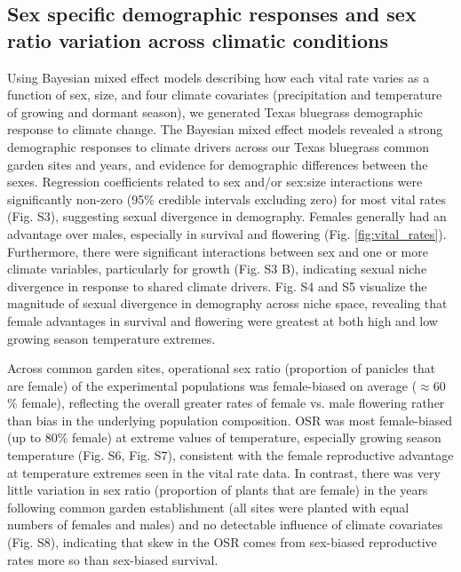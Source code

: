 \documentclass[9pt,twocolumn,twoside,lineno]{pnas-new}
\newcommand{\tom}[2]{{\color{red}{#1}}\footnote{\textit{\color{red}{#2}}}}
\begin{document}
\subsection*{Sex specific demographic responses and sex ratio variation across climatic conditions}
Using Bayesian mixed effect models describing how each vital rate  varies as a function of sex, size, and four climate covariates  (precipitation and temperature of growing and dormant season), we generated Texas bluegrass demographic response to climate change. 
The Bayesian mixed effect models revealed a strong demographic responses to climate drivers across our Texas bluegrass common garden sites and years, and evidence for demographic differences between the sexes. 
Regression coefficients related to sex and/or sex:size interactions were significantly non-zero (95\% credible intervals excluding zero) for most vital rates (Fig. S3), suggesting sexual divergence in demography. 
Females generally had an advantage over males, especially in survival and flowering (Fig. \ref{fig:vital_rates}). 
Furthermore, there were significant interactions between sex and one or more climate variables, particularly for growth (Fig. S3 B), indicating sexual niche divergence in response to shared climate drivers.  
Fig. S4 and  S5 visualize the magnitude of sexual divergence in demography across niche space, revealing that female advantages in survival and flowering  were greatest at both high and low growing season temperature extremes. 

Across common garden sites, operational sex ratio (proportion of panicles that are female) of the experimental populations was female-biased on average ($\approx 60$ \% female), reflecting the overall greater rates of female vs. male flowering rather than bias in the underlying population composition. 
OSR was most female-biased (up to 80\% female) at extreme values of temperature, especially growing season temperature (Fig. S6, Fig. S7), consistent with the female reproductive advantage at temperature extremes seen in the vital rate data. 
In contrast, there was very little variation in sex ratio (proportion of plants that are female) in the years following common garden establishment (all sites were planted with equal numbers of females and males) and no detectable influence of climate covariates (Fig. S8), indicating that skew in the OSR comes from sex-biased reproductive rates more so than sex-biased survival. 
\end{document}
